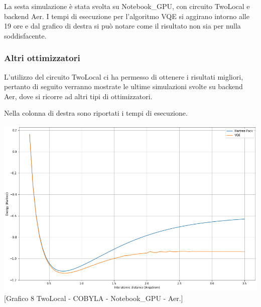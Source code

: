 La sesta simulazione è stata svolta su Notebook\_GPU, con circuito TwoLocal e backend Aer.
I tempi di esecuzione per l'algoritmo VQE si aggirano intorno alle 19 ore e dal grafico di destra si può notare come il risultato non sia per nulla soddisfacente.
\subsubsection{Altri ottimizzatori}
L'utilizzo del circuito TwoLocal ci ha permesso di ottenere i risultati migliori, pertanto di seguito verranno mostrate le ultime simulazioni svolte su backend Aer, dove si ricorre ad altri tipi di ottimizzatori.
\newline\newline
\begin{minipage}[b]{0.39\textwidth}
    \captionsetup{type=table}
    \caption[Risultati simulazione COBYLA.]{Nella colonna di destra sono riportati i tempi di esecuzione.}
    \label{table:notebookgpu_cobyla_aer}
\end{minipage}
\hfill
\begin{minipage}[b]{0.57\textwidth}
    \centering
    \includegraphics[width=1.0\textwidth]{Images/Capitolo3/Plots/H2_twolocal_ry_rz_cz_cobyla_aer_gpu_plot.png}
    [Grafico 8 \newline TwoLocal - COBYLA - Notebook\_GPU - Aer.]{}
    \label{fig:notebookgpu_twolocal_cobyla_aer}
\end{minipage}

